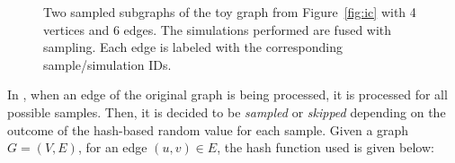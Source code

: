 \begin{figure}[!ht] 
    \centering
  \caption{\small{
  \protect{} Two sampled subgraphs of the toy graph from Figure~\ref{fig:ic} with 4 vertices and 6 edges.
  \protect{} The simulations performed are fused with sampling. Each edge is labeled with the corresponding sample/simulation IDs. 
  }}
  \label{fig:traversal} 
\end{figure}

In \acro, when an edge of the original graph is being processed, it is processed for all possible samples. Then, it is decided to be {\it sampled} or {\it skipped} depending on the outcome of the hash-based random value for each sample. Given a graph $G = (V, E)$, for an edge $(u, v) \in E$, the hash function used is given below:

